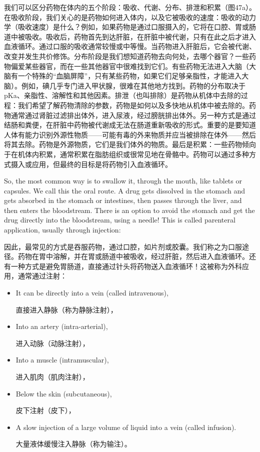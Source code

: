 \documentclass[dvipsnames, svgnames,a4paper,11pt]{article}
\begin{document}
我们可以区分药物在体内的五个阶段：吸收、代谢、分布、排泄和积累（图47a）。在吸收阶段，我们关心的是药物如何进入体内，以及它被吸收的速度：吸收的动力学（吸收速度）是什么？例如，如果药物是通过口服摄入的，它将在口腔、胃或肠道中被吸收。吸收后，药物首先到达肝脏，在肝脏中被代谢，只有在此之后才进入血液循环。通过口服的吸收通常较慢或中等慢。当药物进入肝脏后，它会被代谢、改变并发生共价修饰。分布阶段是我们想知道药物去向何处，去哪个器官？一些药物偏爱某些器官，而在一些其他器官中很难找到它们。有些药物无法进入大脑（大脑有一个特殊的“血脑屏障”，只有某些药物，如果它们足够亲脂性，才能进入大脑）。例如，碘几乎专门进入甲状腺，很难在其他地方找到。药物的分布取决于pKa、亲脂性、溶解性和其他因素。排泄（也叫排除）是药物从机体中去除的过程：我们希望了解药物清除的参数，药物是如何以及多快地从机体中被去除的。药物通常通过肾脏过滤排出体外，进入尿液，经过膀胱排出体外。另一种方式是通过结肠和粪便，在肝脏中药物被代谢成无法在肠道重新吸收的形式。重要的是要知道人体有能力识别外源性物质——可能有毒的外来物质并应当被排除在体外——然后将其去除。药物是外源物质，它们是我们体外的物质。最后是积累：一些药物倾向于在机体内积累，通常积累在脂肪组织或很常见地在骨骼中。药物可以通过多种方式摄入或应用，但最终的目标是将药物引入血液循环。

So, the most common way is to swallow it, through the mouth, like tablets or capsules. We call this the oral route. A drug gets dissolved in the stomach and gets absorbed in the stomach or intestines, then passes through the liver, and then enters the bloodstream. There is an option to avoid the stomach and get the drug directly into the bloodstream, using a needle! This is called parenteral application, usually through injection:

因此，最常见的方式是吞服药物，通过口腔，如片剂或胶囊。我们称之为口服途径。药物在胃中溶解，并在胃或肠道中被吸收，经过肝脏，然后进入血液循环。还有一种方式是避免胃肠道，直接通过针头将药物送入血液循环！这被称为外科应用，通常通过注射：


\begin{itemize}

      \item It can be directly into a vein (called intravenous),

            直接进入静脉（称为静脉注射），

      \item Into an artery (intra-arterial),

            进入动脉（动脉注射），

      \item Into a muscle (intramuscular),

            进入肌肉（肌肉注射），

      \item Below the skin (subcutaneous),

            皮下注射（皮下），

      \item A slow injection of a large volume of liquid into a vein (called infusion).

            大量液体缓慢注入静脉（称为输注）。

\end{itemize}
\end{document}
